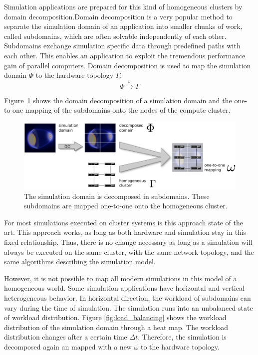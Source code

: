 Simulation applications are prepared for this kind of homogeneous
clusters by domain decomposition.Domain decomposition is a very
popular method to separate the simulation domain of an application
into smaller chunks of work, called subdomains, which are often
solvable independently of each other. Subdomains exchange simulation
specific data through predefined paths with each other. This enables
an application to exploit the tremendous performance gain of parallel
computers.  Domain decomposition is used to map the simulation domain
$\Phi$ to the hardware topology $\Gamma$:
\[\Phi \xrightarrow{\omega} \Gamma\]

\noindent 
Figure~\ref{fig:domain_decomposition} shows the domain decomposition
of a simulation domain and the one-to-one mapping of the subdomains
onto the nodes of the compute cluster.


\begin{figure}[H]
  \centering \includegraphics[width=\textwidth]{graphics/30_domain_decomposition}
  \caption{The simulation domain is decomposed in subdomains. These subdomains
    are mapped one-to-one onto the homogeneous cluster.}
  \label{fig:domain_decomposition}
\end{figure}

\noindent For most simulations executed on cluster systems is this approach
state of the art.  This approach works, as long as both hardware and
simulation stay in this fixed relationship. Thus, there is no change
necessary as long as a simulation will always be executed on the same
cluster, with the same network topology, and the same algorithms
describing the simulation model.

However, it is not possible to map all modern simulations in this
model of a homogeneous world. Some simulation applications have
horizontal and vertical heterogeneous behavior. In horizontal
direction, the workload of subdomains can vary during the time of
simulation. The simulation runs into an unbalanced state of workload
distribution. Figure \ref{fig:load_balancing} shows the workload
distribution of the simulation domain through a heat map. The workload
distribution changes after a certain time $\Delta t$. Therefore, the
simulation is decomposed again an mapped with a new $\omega$ to the
hardware topology.

